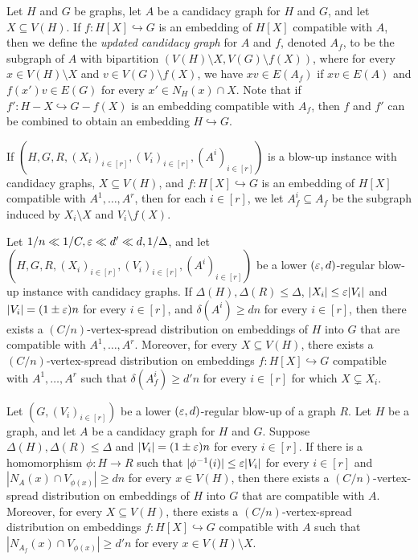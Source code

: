 \documentclass[11pt]{amsart}
\begin{document}
Let $H$ and $G$ be graphs, let $A$ be a candidacy graph for $H$ and $G$, and let $X \subseteq V(H)$.
If $f : H[X] \hookrightarrow G$ is an embedding of $H[X]$ compatible with $A$, then we define the \textit{updated candidacy graph} for $A$ and $f$, denoted $A_f$, to be the subgraph of $A$ with bipartition $(V(H) \setminus X, V(G) \setminus f(X))$, where for every $x \in V(H) \setminus X$ and $v \in V(G) \setminus f(X)$, we have $xv \in E(A_f)$ if $xv\in E(A)$ and $f(x')v \in E(G)$ for every $x' \in N_H(x) \cap X$.
Note that if $f' : H - X \hookrightarrow G - f(X)$ is an embedding compatible with $A_f$, then $f$ and $f'$ can be combined to obtain an embedding $H \hookrightarrow G$.

If $\left(H, G, R, (X_i)_{i\in [r]}, (V_i)_{i\in [r]}, (A^i)_{i \in [r]}\right)$ is a blow-up instance with candidacy graphs, $X \subseteq V(H)$, and $f : H[X] \hookrightarrow G$ is an embedding of $H[X]$ compatible with $A^1, \dots, A^r$, then for each $i \in [r]$, we let $A^i_f \subseteq A_f$ be the subgraph induced by $X_i \setminus X$ and $V_i \setminus f(X)$.
\begin{lemma}\label{lem:partial-embedding}
  Let $1 / n \ll 1/C, \varepsilon \ll d' \ll d, 1 / \Delta$, and let $\left(H, G, R, (X_i)_{i\in [r]}, (V_i)_{i\in [r]}, (A^i)_{i \in [r]}\right)$ be a lower $(\varepsilon, d)$-regular blow-up instance with candidacy graphs.  If $\Delta(H), \Delta(R) \leq \Delta$, $|X_i| \leq \varepsilon |V_i|$ and $|V_i| = (1 \pm \varepsilon)n$ for every $i \in [r]$, and $\delta(A^i) \geq dn$ for every $i \in [r]$, then there exists a $(C / n)$-vertex-spread distribution on embeddings of $H$ into $G$ that are compatible with $A^1, \dots, A^r$.
  Moreover, for every $X \subseteq V(H)$, there exists a $(C / n)$-vertex-spread distribution on embeddings $f : H[X] \hookrightarrow G$ compatible with $A^1, \dots, A^r$ such that $\delta(A^i_f) \geq d'n$ for every $i \in [r]$ for which $X \subsetneq X_i$.

  Let $(G, (V_i)_{i \in [r]})$ be a lower $(\varepsilon, d)$-regular blow-up of a graph $R$.
   Let $H$ be a graph, and let $A$ be a candidacy graph for $H$ and $G$.
   Suppose $\Delta(H), \Delta(R) \leq \Delta$ and $|V_i| = (1 \pm \varepsilon)n$ for every $i \in [r]$.
   If there is a homomorphism $\phi : H \rightarrow R$ such that $|\phi^{-1}(i)| \leq \varepsilon |V_i|$ for every $i \in [r]$ and $|N_A(x) \cap V_{\phi(x)}| \geq dn$ for every $x \in V(H)$, then there exists a $(C/n)$-vertex-spread distribution on embeddings of $H$ into $G$ that are compatible with $A$. Moreover, for every $X\subseteq V(H)$, there exists a $(C/n)$-vertex-spread distribution on embeddings $f: H[X]\hookrightarrow G$ compatible with $A$ such that $|N_{A_f}(x) \cap V_{\phi(x)}| \geq d' n$ for every $x \in V(H)\setminus X$.
\end{lemma}
\end{document}
